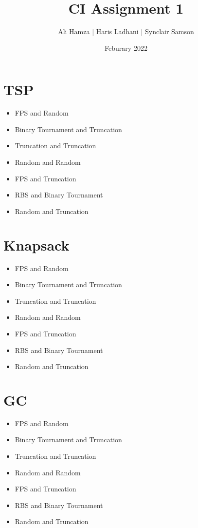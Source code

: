 \documentclass{article}
\title{CI Assignment 1}
\date{Feburary 2022}
\author{Ali Hamza | Haris Ladhani | Synclair Samson}
\begin{document}
\maketitle

\section{TSP}

\begin{itemize}
    \item FPS and Random
    \item Binary Tournament and Truncation
    \item Truncation and Truncation
    \item Random and Random
    \item FPS and Truncation
    \item RBS and Binary Tournament
    \item Random and Truncation
\end{itemize}



\section{Knapsack}

\begin{itemize}
    \item FPS and Random
    \item Binary Tournament and Truncation
    \item Truncation and Truncation
    \item Random and Random
    \item FPS and Truncation
    \item RBS and Binary Tournament
    \item Random and Truncation
\end{itemize}

\section{GC}

\begin{itemize}
    \item FPS and Random
    \item Binary Tournament and Truncation
    \item Truncation and Truncation
    \item Random and Random
    \item FPS and Truncation
    \item RBS and Binary Tournament
    \item Random and Truncation
\end{itemize}
\end{document}
